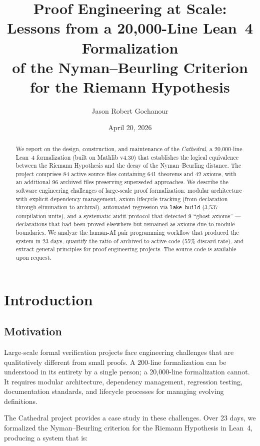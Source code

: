 \documentclass[11pt,a4paper]{article}
\title{%
  Proof Engineering at Scale:\\
  Lessons from a 20,000-Line Lean~4 Formalization\\
  of the Nyman--Beurling Criterion for the Riemann Hypothesis%
}
\author{
  Jason Robert Gochanour
}
\date{April 20, 2026}
\theoremstyle{definition}
\begin{document}
\maketitle

\begin{abstract}
We report on the design, construction, and maintenance of the
\emph{Cathedral}, a 20,000-line Lean~4 formalization (built on
Mathlib v4.30) that establishes the logical equivalence between
the Riemann Hypothesis and the decay of the Nyman--Beurling
distance. The project comprises 84 active source files containing
641 theorems and 42 axioms, with an additional 96 archived files
preserving superseded approaches. We describe the software
engineering challenges of large-scale proof formalization:
modular architecture with explicit dependency management, axiom
lifecycle tracking (from declaration through elimination to
archival), automated regression via \texttt{lake build} (3,537
compilation units), and a systematic audit protocol that detected
9 ``ghost axioms'' --- declarations that had been proved elsewhere
but remained as axioms due to module boundaries. We analyze the
human-AI pair programming workflow that produced the system in 23
days, quantify the ratio of archived to active code (55\%
discard rate), and extract general principles for proof engineering
projects. The source code is available upon request.
\end{abstract}

\tableofcontents

\section{Introduction}

\subsection{Motivation}

Large-scale formal verification projects face engineering challenges
that are qualitatively different from small proofs. A 200-line
formalization can be understood in its entirety by a single person;
a 20,000-line formalization cannot. It requires modular architecture,
dependency management, regression testing, documentation standards,
and lifecycle processes for managing evolving definitions.

The Cathedral project provides a case study in these challenges. Over
23 days, we formalized the Nyman--Beurling criterion for the Riemann
Hypothesis in Lean~4, producing a system that is:
\end{document}
